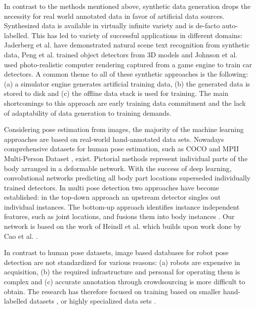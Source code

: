 \documentclass[conference]{IEEEtran}
\begin{document}

In contrast to the methods mentioned above, synthetic data generation drops the necessity for real world annotated data in favor of artificial data sources. Synthesized data is available in virtually infinite variety and is de-facto auto-labelled. This has led to variety of successful applications in different domains: Jaderberg et al. \cite{jaderberg2014synthetic} have demonstrated natural scene text recognition from synthetic data, Peng et al. \cite{peng2015learning} trained object detectors from 3D models and Johnson et al. \cite{2017_Johnson_DrivingInTheMatrix} used photo-realistic computer rendering captured from a game engine to train car detectors. A common theme to all of these synthetic approaches is the following: (a) a simulator engine generates artificial training data, (b) the generated data is stored to disk and (c) the offline data stack is used for training. The main shortcomings to this approach are early training data commitment and the lack of adaptability of data generation to training demands.

Considering pose estimation from images, the majority of the machine learning approaches are based on real-world hand-annotated data sets. Nowadays comprehensive datasets for human pose estimation, such as COCO \cite{lin2014microsoft} and MPII Multi-Person Dataset \cite{andriluka20142d}, exist. Pictorial methods \cite{fischler1973representation, felzenszwalb2005pictorial} represent individual parts of the body arranged in a deformable network. With the success of deep learning, convolutional networks \cite{oliveira2016deep} predicting all body part locations superseded individually trained detectors. In multi pose detection two approaches have become established: in the top-down approach \cite{gkioxari2014using, sun2011articulated} an upstream detector singles out individual instances. The bottom-up approach identifies instance independent features, such as joint locations, and fusions them into body instances \cite{insafutdinov2016deepercut, wei2016convolutional}. Our network is based on the work of Heindl et al. \cite{cheind2019disp} which builds upon work done by Cao et al. \cite{cao2017realtime}.

In contrast to human pose datasets, image based databases for robot pose detection are not standardized for various reasons: (a) robots are expensive in acquisition, (b) the required infrastructure and personal for operating them is complex and (c) accurate annotation through crowdsourcing is more difficult to obtain. The research has therefore focused on training based on smaller hand-labelled datasets \cite{miseikis2018multi, miseikis2018transfer, garcia2013guidance, varhegyivisual}, or highly specialized data sets \cite{levine2018learning}.
\end{document}
